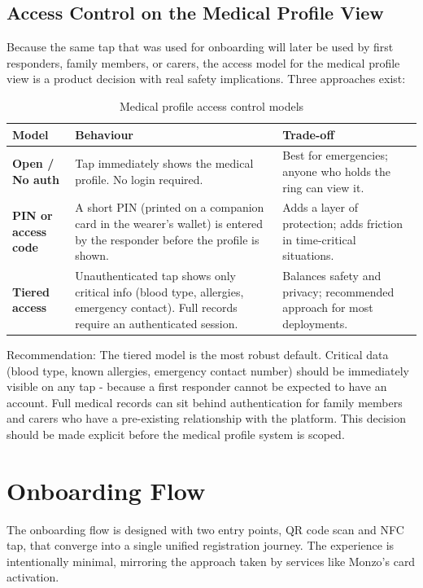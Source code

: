 \documentclass[
	a4paper, %
]{ChaosEngineReport}
\begin{document}
\newpage

\subsection{Access Control on the Medical Profile View}

Because the same tap that was used for onboarding will later be used by first responders, family members, or carers, the access model for the medical profile view is a product decision with real safety implications. Three approaches exist:

\begin{table}[h!]
\centering
\small
{}
\begin{tabularx}{\linewidth}{@{} L{2.8cm} X L{3.0cm} @{}}
  \toprule
  \textbf{Model} &
  \textbf{Behaviour} &
  \textbf{Trade-off} \\
  \midrule
  \textbf{Open / No auth} & Tap immediately shows the medical profile. No login required. & Best for emergencies; anyone who holds the ring can view it. \\
  \textbf{PIN or access code} & A short PIN (printed on a companion card in the wearer's wallet) is entered by the responder before the profile is shown. & Adds a layer of protection; adds friction in time-critical situations. \\
  \textbf{Tiered access} & Unauthenticated tap shows only critical info (blood type, allergies, emergency contact). Full records require an authenticated session. & Balances safety and privacy; recommended approach for most deployments. \\
\end{tabularx}
\caption{Medical profile access control models}
\end{table}

\begin{callout_box}{Recommendation:}
The tiered model is the most robust default. Critical data (blood type, known allergies, emergency contact number) should be immediately visible on any tap - because a first responder cannot be expected to have an account. Full medical records can sit behind authentication for family members and carers who have a pre-existing relationship with the platform. This decision should be made explicit before the medical profile system is scoped.
\end{callout_box}

\newpage

\section{Onboarding Flow}
The onboarding flow is designed with two entry points, QR code scan and NFC tap, that converge into a single unified registration journey. The experience is intentionally minimal, mirroring the approach taken by services like Monzo's card activation.
\end{document}
